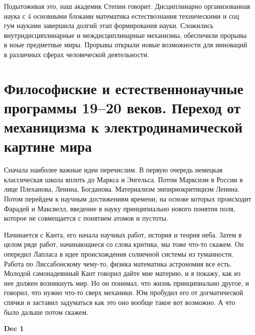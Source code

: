 \documentclass[a4paper, 12pt]{article}
\begin{document}
Подытоживая это, наш академик Степин говорит. Дисциплинарно 
организованная наука с 4 основными блоками математика естествознания 
техническими и соц гум науками завершила долгий этап формирования науки. 
Сложились внутридисциплинарные и междисциплинарные механизмы, обеспечили 
прорывы в ноые предметные миры. Прорывы открыли новые возможности для 
инноваций в различных сферах человеческой деятельности.



\section{Философиские и естественнонаучные программы 19--20 веков. 
Переход от механицизма к электродинамической картине мира}

Сначала наиболее важные идеи перечислим. В первую очередь немецкая 
классическая школа вплоть до Маркса и Энгельса. Потом Марксизм в России 
в лице Плеханова, Ленина, Богданова. Материализм эмпириокритицизм 
Ленина. Потом перейдем к научным достижениям времени, на основе которых 
происходит Фарадей и Максвелл, введение в науку принципиально нового 
понятия поля, которое не совмещается с понятием атомов и пустоты.

Начинается с Канта, его начала научных работ, история и теория неба. 
Затем в целом ряде работ, начинающиеся со слова критика, мы тоже что-то 
скажем. Он опередил Лапласа в идее происхождения солнечной системы из 
туманности. Работа по Лиссабонскому чему-то, физика математика 
астрономия все есть. Молодой самонадеянный Кант говорил дайте мне 
материю, и я покажу, как из нее должен возникнуть мир. Но он понимал, 
что жизнь принципиально другое, и говорил, что нужно что-то сверх 
механики. Юм пробудил его от догматической спячки и заставил задуматься 
как это оно вообще такое вот возможно. А что было дальше потом скажем.

\hfill \textbf{Dec 1}
\end{document}
